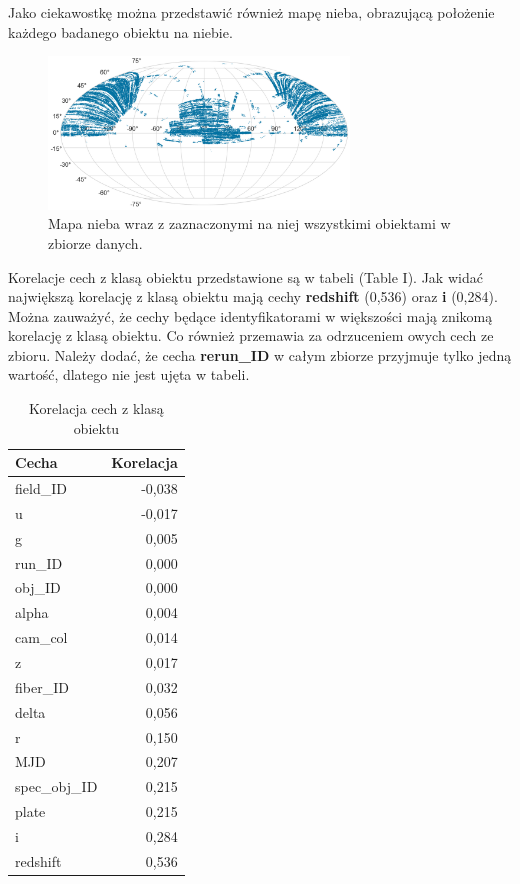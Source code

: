 \documentclass[conference]{IEEEtran}
\begin{document}
Jako ciekawostkę można przedstawić również mapę nieba, obrazującą położenie każdego badanego obiektu na niebie. 

\begin{figure}[ht]
        \centering
        \includegraphics[width = 8cm]{figures/celestial_map.png}
        \caption{Mapa nieba wraz z zaznaczonymi na niej wszystkimi obiektami w zbiorze danych.}
\end{figure}
Korelacje cech z klasą obiektu przedstawione są w tabeli (Table I). Jak widać największą korelację z klasą obiektu mają cechy \textbf{redshift} (0,536) oraz \textbf{i} (0,284). Można zauważyć, że cechy będące identyfikatorami w większości mają znikomą korelację z klasą obiektu. Co również przemawia za odrzuceniem owych cech ze zbioru. Należy dodać, że cecha \textbf{rerun\_ID} w całym zbiorze przyjmuje tylko jedną wartość, dlatego nie jest ujęta w tabeli. 


\begin{table}[ht]
    \centering
    \begin{tabular}{|l|r|}
        \hline
        Cecha & Korelacja \\
        \hline
        field\_ID & -0,038 \\
        \hline
        u & -0,017 \\
        \hline
        g & 0,005 \\
        \hline
        run\_ID & 0,000 \\
        \hline
        obj\_ID & 0,000 \\
        \hline
        alpha & 0,004 \\
        \hline
        cam\_col & 0,014 \\
        \hline
        z & 0,017 \\
        \hline
        fiber\_ID & 0,032 \\
        \hline
        delta & 0,056 \\
        \hline
        r & 0,150 \\
        \hline
        MJD & 0,207 \\
        \hline
        spec\_obj\_ID & 0,215 \\
        \hline
        plate & 0,215 \\
        \hline
        i & 0,284 \\
        \hline
        redshift & 0,536 \\
        \hline
        
    \end{tabular}
    \caption{Korelacja cech z klasą obiektu}
\end{table} 
\end{document}
